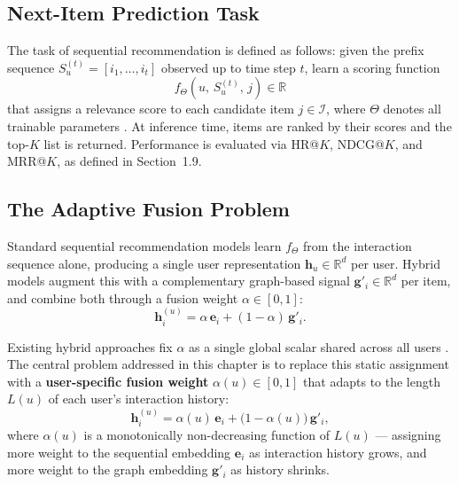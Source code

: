 \documentclass[12pt,a4paper]{report}
\newcommand{\parencite}[1]{\citep{#1}}
\begin{document}
\subsection{Next-Item Prediction Task}

The task of sequential recommendation is defined as follows:
given the prefix sequence $S_u^{(t)} = [i_1, \ldots, i_t]$
observed up to time step $t$, learn a scoring function
\begin{equation}
  f_\Theta\!\left(u,\, S_u^{(t)},\, j\right) \in \mathbb{R}
\end{equation}
that assigns a relevance score to each candidate item
$j \in \mathcal{I}$, where $\Theta$ denotes all trainable
parameters \parencite{ouledmeriem2025hybrid}. At inference time,
items are ranked by their scores and the top-$K$ list is returned.
Performance is evaluated via HR@$K$, NDCG@$K$, and MRR@$K$,
as defined in Section~1.9.

\subsection{The Adaptive Fusion Problem}

Standard sequential recommendation models learn $f_\Theta$ from
the interaction sequence alone, producing a single user
representation $\mathbf{h}_u \in \mathbb{R}^d$ per user. Hybrid
models augment this with a complementary graph-based signal
$\mathbf{g}'_i \in \mathbb{R}^d$ per item, and combine both
through a fusion weight $\alpha \in [0,1]$:
\begin{equation}
  \mathbf{h}_i^{(u)} = \alpha\, \mathbf{e}_i
                     + (1 - \alpha)\, \mathbf{g}'_i.
\end{equation}

Existing hybrid approaches fix $\alpha$ as a single global scalar
shared across all users \parencite{ouledmeriem2025hybrid}. The
central problem addressed in this chapter is to replace this
static assignment with a \textbf{user-specific fusion weight}
$\alpha(u) \in [0,1]$ that adapts to the length $L(u)$ of each
user's interaction history:
\begin{equation}
  \mathbf{h}_i^{(u)} = \alpha(u)\, \mathbf{e}_i
                     + \bigl(1 - \alpha(u)\bigr)\, \mathbf{g}'_i,
\end{equation}
where $\alpha(u)$ is a monotonically non-decreasing function of
$L(u)$ --- assigning more weight to the sequential embedding
$\mathbf{e}_i$ as interaction history grows, and more weight to
the graph embedding $\mathbf{g}'_i$ as history shrinks.
\end{document}
